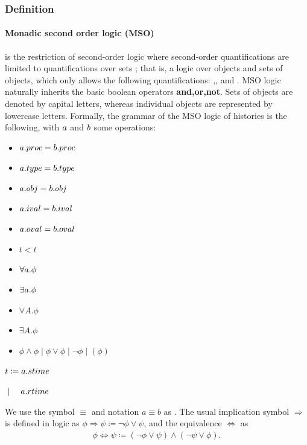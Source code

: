 \documentclass[12pt]{article}
\begin{document}
\subsubsection{Definition}

\paragraph{Monadic second order logic (MSO)} is the restriction of second-order logic where second-order quantifications are limited to quantifications over sets \cite{DefMSOlogic}; that is, a logic over objects and sets of objects, which only allows the following quantifications: ,, and . MSO logic naturally inherits the basic boolean operators \textbf{and,or,not}. Sets of objects are denoted by capital letters, whereas individual objects are represented by lowercase letters. Formally, the grammar of the MSO logic of histories is the following, with $a$ and $b$ some operations:

\begin{itemize}[label=$\mid$,itemsep=0pt,parsep=0pt]
    \item[$\phi :=$] $a.proc=b.proc$
    \item $a.type=b.type$
    \item $a.obj=b.obj$
    \item $a.ival=b.ival$
    \item $a.oval=b.oval$
    \item $t<t$
    \item $\forall a.\phi$
    \item $\exists a.\phi$
    \item $\forall A.\phi$
    \item $\exists A.\phi$
    \item $\phi\land\phi \mid \phi\lor\phi \mid \neg\phi \mid (\phi)$
\end{itemize}

\noindent $t\coloneq a.stime$

$\;\mid\quad a.rtime$


\vspace{1em}

We use the symbol $\equiv$ and notation $a\equiv b$ as . The usual implication symbol $\Rightarrow$ is defined in logic as $\phi \Rightarrow\psi\coloneq\neg\phi\lor\psi$, and the equivalence $\Leftrightarrow$ as 
\vspace{0.4em}
\begin{gather*}
\phi\Leftrightarrow\psi\coloneq(\neg\phi\lor\psi)\land(\neg\psi\lor\phi).
\end{gather*}
\end{document}
